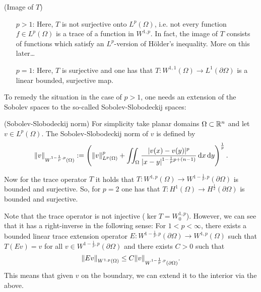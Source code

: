 \documentclass[11pt]{article}
\begin{document}
    		\begin{remark}
    			(Image of $T$)
    			\begin{enumerate}\itemindent2em
    				\item [$p>1$:] Here, $T$ is not surjective onto $L^p(\Omega)$, i.e. not every function $f\in L^p(\Omega)$ is a trace of a function in $W^{1,p}$. In fact, the image of  $T$ consists of functions which satisfy an $L^p$-version of H{\"o}lder's inequality. More on this later\dots
    				\item [$p=1$:] Here, $T$ is surjective and one has that $T:W^{1,1}(\Omega)\rightarrow L^1(\partial\Omega)$ is a linear bounded, surjective map.
    			\end{enumerate}
    		\end{remark}
    
    		To remedy the situation in the case of $p>1$, one needs an extension of the Sobolev spaces to the so-called Sobolev-Slobodeckij spaces: 
    		
    		\begin{defi}(Sobolev-Slobodeckij norm)
    			For simplicity take planar domains $\Omega\subset\mathbb{R}^n$ and let $v\in L^p(\Omega)$. The Sobolev-Slobodeckij norm of $v$ is defined by
    			\begin{equation*}
    				\norm{v}_{W^{1-\frac{1}{p},p}(\Omega)}:=\left(\norm{v}_{L^p(\Omega)}^p+\iint_{\Omega}\frac{|v(x)-v(y)|^p}{|x-y|^{1-\frac{1}{p}p+(n-1)}}\,\mathrm{d}x\,\mathrm{d}y\right)^{\frac{1}{p}}.
    			\end{equation*}
    		\end{defi}
    
    		Now for the trace operator $T$ it holds that $T:W^{1,p}(\Omega)\rightarrow W^{1-\frac{1}{p},p}(\partial\Omega)$ is bounded and surjective. So, for $p=2$ one has that $T:H^1(\Omega)\rightarrow H^{\frac{1}{2}}(\partial\Omega)$ is bounded and surjective. 
    
    		\begin{remark}
    			Note that the trace operator is not injective ($\ker T=W_0^{1,p}$). However, we can see that it has a right-inverse in the following sense: For $1<p<\infty$, there exists a bounded linear trace extension operator $E:W^{1-\frac{1}{p},p}(\partial\Omega)\rightarrow W^{1,p}(\Omega)$ such that $T(Ev)=v$ for all $v\in W^{1-\frac{1}{p},p}(\partial\Omega)$ and there exists $C>0$ such that
    			\begin{equation*}
    				\norm{Ev}_{W^{1,p}(\Omega)}\le C\norm{v}_{W^{1-\frac{1}{p},p}(\partial\Omega)}.
    			\end{equation*}
    			This means that given $v$ on the boundary, we can extend it to the interior via the above.
    		\end{remark}
\end{document}
